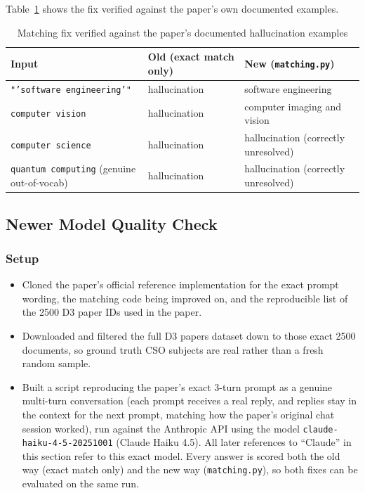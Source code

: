 Table~\ref{tab:matching-fix-examples} shows the fix verified against the paper's own documented examples.

\begin{table}[h]
\centering
\caption{Matching fix verified against the paper's documented hallucination examples}
\label{tab:matching-fix-examples}
\begin{tabular}{lll}
\toprule
Input & Old (exact match only) & New (\texttt{matching.py}) \\
\midrule
\texttt{"'software engineering'"} & hallucination & software engineering \\
\texttt{computer vision} & hallucination & computer imaging and vision \\
\texttt{computer science} & hallucination & hallucination (correctly unresolved) \\
\texttt{quantum computing} (genuine out-of-vocab) & hallucination & hallucination (correctly unresolved) \\
\bottomrule
\end{tabular}
\end{table}

\subsection{Newer Model Quality Check}

\subsubsection{Setup}

\begin{itemize}
    \item Cloned the paper's official reference implementation for the exact prompt wording, the matching code being improved on, and the reproducible list of the 2500 D3 paper IDs used in the paper.
    \item Downloaded and filtered the full D3 papers dataset down to those exact 2500 documents, so ground truth CSO subjects are real rather than a fresh random sample.
    \item Built a script reproducing the paper's exact 3-turn prompt as a genuine multi-turn conversation (each prompt receives a real reply, and replies stay in the context for the next prompt, matching how the paper's original chat session worked), run against the Anthropic API using the model \texttt{claude-haiku-4-5-20251001} (Claude Haiku 4.5). All later references to ``Claude'' in this section refer to this exact model. Every answer is scored both the old way (exact match only) and the new way (\texttt{matching.py}), so both fixes can be evaluated on the same run.
\end{itemize}

